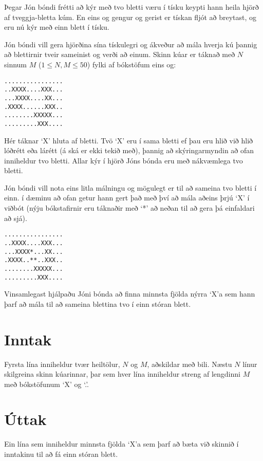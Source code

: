 

Þegar Jón bóndi frétti að kýr með tvo bletti væru í tísku keypti hann heila
hjörð af tveggja-bletta kúm. En eins og gengur og gerist er tískan fljót að
breytast, og eru nú kýr með einn blett í tísku.

Jón bóndi vill gera hjörðina sína tískulegri og ákveður að mála hverja kú
þannig að blettirnir tveir sameinist og verði að einum. Skinn kúar er táknað
með $N$ sinnum $M$ ($1 \leq N, M \leq 50$) fylki af
bókstöfum eins og:

\begin{verbatim}
................
..XXXX....XXX...
...XXXX....XX...
.XXXX......XXX..
........XXXXX...
.........XXX....
\end{verbatim}

Hér táknar `X' hluta af bletti. Tvö `X' eru í sama
bletti ef þau eru hlið við hlið lóðrétt eða lárétt (á ská er ekki tekið með),
þannig að skýringarmyndin að ofan inniheldur tvo bletti. Allar kýr í hjörð Jóns
bónda eru með nákvæmlega tvo bletti.

Jón bóndi vill nota eins litla málningu og mögulegt er til að sameina tvo
bletti í einn. í dæminu að ofan getur hann gert það með því að mála aðeins þrjú
`X' í viðbót (nýju bókstafirnir eru táknaðir með `*' að
neðan til að gera þá einfaldari að sjá).

\begin{verbatim}
................
..XXXX....XXX...
...XXXX*...XX...
.XXXX..**..XXX..
........XXXXX...
.........XXX....
\end{verbatim}

Vinsamlegast hjálpaðu Jóni bónda að finna minnsta fjölda nýrra `X'a
sem hann þarf að mála til að sameina blettina tvo í einn stóran blett.

\section*{Inntak}
Fyrsta lína inniheldur tvær heiltölur, $N$ og $M$, aðskildar með
bili. Næstu $N$ línur skilgreina skinn kúarinnar, þar sem hver lína
inniheldur streng af lengdinni $M$ með bókstöfunum `X' og
`.'.

\section*{Úttak}
Ein lína sem inniheldur minnsta fjölda `X'a sem þarf að bæta við
skinnið í inntakinu til að fá einn stóran blett.

